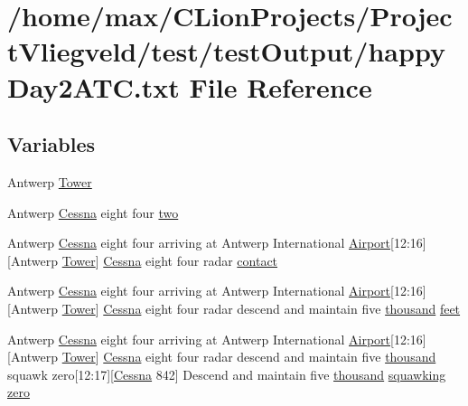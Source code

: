 \hypertarget{happyDay2ATC_8txt}{}\section{/home/max/\+C\+Lion\+Projects/\+Project\+Vliegveld/test/test\+Output/happy\+Day2\+A\+TC.txt File Reference}
\label{happyDay2ATC_8txt}
\subsection*{Variables}
\begin{DoxyCompactItemize}
\item 
Antwerp \hyperlink{happyDay2ATC_8txt_a53ba8c5e293ec8b769402961740bf7b2}{Tower}
\item 
Antwerp \hyperlink{test_2testOutput_2log_8txt_a3de326468ae3f37941c91ae68853a1af}{Cessna} eight four \hyperlink{happyDay2ATC_8txt_a8cad909be335793c9a2bc86d42edc8a5}{two}
\item 
Antwerp \hyperlink{test_2testOutput_2log_8txt_a3de326468ae3f37941c91ae68853a1af}{Cessna} eight four arriving at Antwerp International \hyperlink{classAirport}{Airport}\mbox{[}12\+:16\mbox{]}\mbox{[}Antwerp \hyperlink{test_2testOutput_2log_8txt_ade5c2a9317c664c53d015e41bdc32393}{Tower}\mbox{]} \hyperlink{test_2testOutput_2log_8txt_a3de326468ae3f37941c91ae68853a1af}{Cessna} eight four radar \hyperlink{happyDay2ATC_8txt_aabccce409c3b74e74ea0c068d4a73f10}{contact}
\item 
Antwerp \hyperlink{test_2testOutput_2log_8txt_a3de326468ae3f37941c91ae68853a1af}{Cessna} eight four arriving at Antwerp International \hyperlink{classAirport}{Airport}\mbox{[}12\+:16\mbox{]}\mbox{[}Antwerp \hyperlink{test_2testOutput_2log_8txt_ade5c2a9317c664c53d015e41bdc32393}{Tower}\mbox{]} \hyperlink{test_2testOutput_2log_8txt_a3de326468ae3f37941c91ae68853a1af}{Cessna} eight four radar descend and maintain five \hyperlink{happyDay5ExpectedATC_8txt_a429913a0643fe14faca3dca538caa7bb}{thousand} \hyperlink{happyDay2ATC_8txt_adb5a296986a5b6019ec88f520f243c26}{feet}
\item 
Antwerp \hyperlink{test_2testOutput_2log_8txt_a3de326468ae3f37941c91ae68853a1af}{Cessna} eight four arriving at Antwerp International \hyperlink{classAirport}{Airport}\mbox{[}12\+:16\mbox{]}\mbox{[}Antwerp \hyperlink{test_2testOutput_2log_8txt_ade5c2a9317c664c53d015e41bdc32393}{Tower}\mbox{]} \hyperlink{test_2testOutput_2log_8txt_a3de326468ae3f37941c91ae68853a1af}{Cessna} eight four radar descend and maintain five \hyperlink{happyDay5ExpectedATC_8txt_a429913a0643fe14faca3dca538caa7bb}{thousand} squawk zero\mbox{[}12\+:17\mbox{]}\mbox{[}\hyperlink{test_2testOutput_2log_8txt_a3de326468ae3f37941c91ae68853a1af}{Cessna} 842\mbox{]} Descend and maintain five \hyperlink{happyDay5ExpectedATC_8txt_a429913a0643fe14faca3dca538caa7bb}{thousand} \hyperlink{test_2testOutput_2log_8txt_a890147ec88e2d9518adf949981616843}{squawking} \hyperlink{happyDay2ATC_8txt_adce466d7618784129bcb0feb6d2d98e4}{zero}

\end{DoxyCompactItemize}
